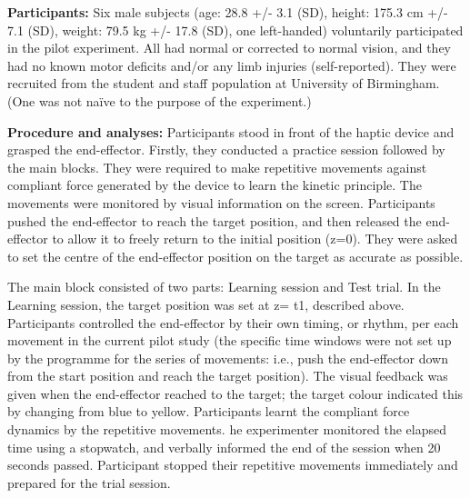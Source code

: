 
\textbf{Participants:} Six male subjects (age: 28.8 +/- 3.1 (SD), height: 175.3 cm +/- 7.1 (SD), 
weight: 79.5 kg +/- 17.8 (SD), one left-handed) voluntarily participated in the 
pilot experiment. All had normal or corrected to normal vision, and they had no 
known motor deficits and/or any limb injuries (self-reported). They were 
recruited from the student and staff population at University of Birmingham. 
(One was not naïve to the purpose of the experiment.)


\textbf{Procedure and analyses:} Participants stood in front of the haptic device and grasped the end-effector. 
Firstly, they conducted a practice session followed by the main blocks. They 
were required to make repetitive movements against compliant force generated by 
the device to learn the kinetic principle. The movements were monitored by 
visual information on the screen. Participants pushed the end-effector to reach 
the target position, and then released the end-effector to allow it to freely 
return to the initial position (z=0). They were asked to set the centre of the 
end-effector position on the target as accurate as possible. 

The main block consisted of two parts: Learning session and Test trial. In the 
Learning session, the target position was set at z= t1, described above. 
Participants controlled the end-effector by their own timing, or rhythm, per 
each movement in the current pilot study (the specific time windows were not 
set up by the programme for the series of movements: i.e., push the 
end-effector down from the start position and reach the target position). 
The visual feedback was given when the end-effector reached to the target; 
the target colour indicated this by changing from blue to yellow. 
Participants learnt the compliant force dynamics by the repetitive movements. 
he experimenter monitored the elapsed time using a stopwatch, and verbally 
informed the end of the session when 20 seconds passed. Participant stopped 
their repetitive movements immediately and prepared for the trial session. 

